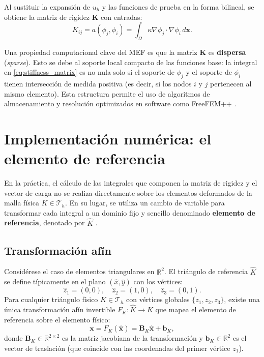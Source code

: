 \documentclass[12pt, letterpaper]{report}
\theoremstyle{definition}
\begin{document}
Al sustituir la expansión de $u_h$ y las funciones de prueba en la forma bilineal, se obtiene la matriz de rigidez $\mathbf{K}$ con entradas:
\begin{equation}\label{eq:stiffness_matrix}
    K_{ij} = a(\phi_j, \phi_i) = \int_\Omega \kappa \nabla \phi_j \cdot \nabla \phi_i \, d\mathbf{x}.
\end{equation}

Una propiedad computacional clave del MEF es que la matriz $\mathbf{K}$ es \textbf{dispersa} (\textit{sparse}). Esto se debe al soporte local compacto de las funciones base: la integral en \eqref{eq:stiffness_matrix} es no nula solo si el soporte de $\phi_j$ y el soporte de $\phi_i$ tienen intersección de medida positiva (es decir, si los nodos $i$ y $j$ pertenecen al mismo elemento). Esta estructura permite el uso de algoritmos de almacenamiento y resolución optimizados en software como FreeFEM++ \cite{hecht2012new}.

\section{Implementación numérica: el elemento de referencia}

En la práctica, el cálculo de las integrales que componen la matriz de rigidez y el vector de carga no se realiza directamente sobre los elementos deformados de la malla física $K \in \mathcal{T}_h$. En su lugar, se utiliza un cambio de variable para transformar cada integral a un dominio fijo y sencillo denominado \textbf{elemento de referencia}, denotado por $\hat{K}$ \cite{ciarlet2002finite}.

\subsection{Transformación afín}

Considérese el caso de elementos triangulares en $\mathbb{R}^2$. El triángulo de referencia $\hat{K}$ se define típicamente en el plano $(\hat{x}, \hat{y})$ con los vértices:
\[
\hat{z}_1 = (0,0), \quad \hat{z}_2 = (1,0), \quad \hat{z}_3 = (0,1).
\]
Para cualquier triángulo físico $K \in \mathcal{T}_h$ con vértices globales $\{z_1, z_2, z_3\}$, existe una única transformación afín invertible $F_K: \hat{K} \to K$ que mapea el elemento de referencia sobre el elemento físico:
\begin{equation}
    \mathbf{x} = F_K(\hat{\mathbf{x}}) = \mathbf{B}_K \hat{\mathbf{x}} + \mathbf{b}_K,
\end{equation}
donde $\mathbf{B}_K \in \mathbb{R}^{2\times 2}$ es la matriz jacobiana de la transformación y $\mathbf{b}_K \in \mathbb{R}^2$ es el vector de traslación (que coincide con las coordenadas del primer vértice $z_1$).
\end{document}
